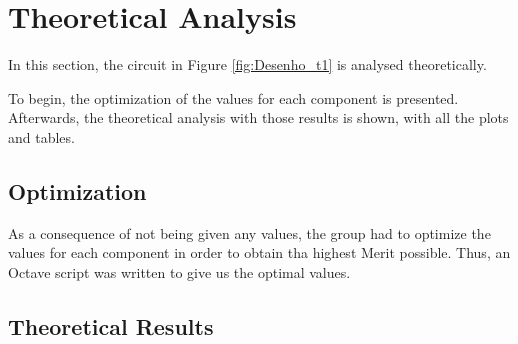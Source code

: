 
\section{Theoretical Analysis}
\label{sec:analysis}



In this section, the circuit in Figure \ref{fig:Desenho_t1} is analysed theoretically.

To begin, the optimization of the values for each component is presented. Afterwards,
the theoretical analysis with those results is shown, with all the plots and tables.



\subsection{Optimization}
\label{subsec:optim}

As a consequence of not being given any values, the group had to optimize the values
for each component in order to obtain tha highest Merit possible. Thus, an Octave script
was written to give us the optimal values.



\subsection{Theoretical Results}
\label{subsec:res_the}


